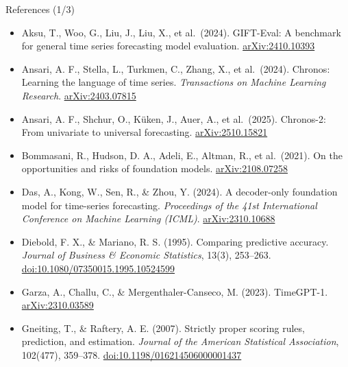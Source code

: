 \begin{frame}{References (1/3)}
\itemsize{\scriptsize}
\begin{itemize}
    \item Aksu, T., Woo, G., Liu, J., Liu, X., et al.\ (2024). GIFT-Eval: A benchmark for general time series forecasting model evaluation. \href{https://arxiv.org/abs/2410.10393}{arXiv:2410.10393}
    \item Ansari, A. F., Stella, L., Turkmen, C., Zhang, X., et al.\ (2024). Chronos: Learning the language of time series. \textit{Transactions on Machine Learning Research}. \href{https://arxiv.org/abs/2403.07815}{arXiv:2403.07815}
    \item Ansari, A. F., Shchur, O., Küken, J., Auer, A., et al.\ (2025). Chronos-2: From univariate to universal forecasting. \href{https://arxiv.org/abs/2510.15821}{arXiv:2510.15821}
    \item Bommasani, R., Hudson, D. A., Adeli, E., Altman, R., et al.\ (2021). On the opportunities and risks of foundation models. \href{https://arxiv.org/abs/2108.07258}{arXiv:2108.07258}
    \item Das, A., Kong, W., Sen, R., \& Zhou, Y. (2024). A decoder-only foundation model for time-series forecasting. \textit{Proceedings of the 41st International Conference on Machine Learning (ICML)}. \href{https://arxiv.org/abs/2310.10688}{arXiv:2310.10688}
    \item Diebold, F. X., \& Mariano, R. S. (1995). Comparing predictive accuracy. \textit{Journal of Business \& Economic Statistics}, 13(3), 253--263. \href{https://doi.org/10.1080/07350015.1995.10524599}{doi:10.1080/07350015.1995.10524599}
    \item Garza, A., Challu, C., \& Mergenthaler-Canseco, M. (2023). TimeGPT-1. \href{https://arxiv.org/abs/2310.03589}{arXiv:2310.03589}
    \item Gneiting, T., \& Raftery, A. E. (2007). Strictly proper scoring rules, prediction, and estimation. \textit{Journal of the American Statistical Association}, 102(477), 359--378. \href{https://doi.org/10.1198/016214506000001437}{doi:10.1198/016214506000001437}
\end{itemize}
\end{frame}

